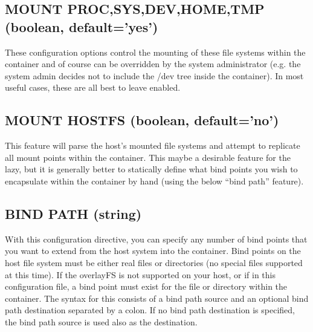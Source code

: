 \documentclass[letterpaper,10pt,english]{sphinxmanual}
\begin{document}
\subsection{MOUNT PROC,SYS,DEV,HOME,TMP (boolean, default=’yes’)}
\label{\detokenize{the_singularity_config_file:mount-proc-sys-dev-home-tmp-boolean-default-yes}}
These configuration options control the mounting of these file systems
within the container and of course can be overridden by the system
administrator (e.g. the system admin decides not to include the /dev
tree inside the container). In most useful cases, these are all best to
leave enabled.


\subsection{MOUNT HOSTFS (boolean, default=’no’)}
\label{\detokenize{the_singularity_config_file:mount-hostfs-boolean-default-no}}
This feature will parse the host’s mounted file systems and attempt to
replicate all mount points within the container. This maybe a desirable
feature for the lazy, but it is generally better to statically define
what bind points you wish to encapsulate within the container by hand
(using the below “bind path” feature).


\subsection{BIND PATH (string)}
\label{\detokenize{the_singularity_config_file:bind-path-string}}
With this configuration directive, you can specify any number of bind
points that you want to extend from the host system into the
container. Bind points on the host file system must be either real
files or directories (no special files supported at this time). If the
overlayFS is not supported on your host, or if  in this configuration
file, a bind point must exist for the file or directory within the
container.
The syntax for this consists of a bind path source and an optional
bind path destination separated by a colon. If no bind path
destination is specified, the bind path source is used also as the
destination.
\end{document}
